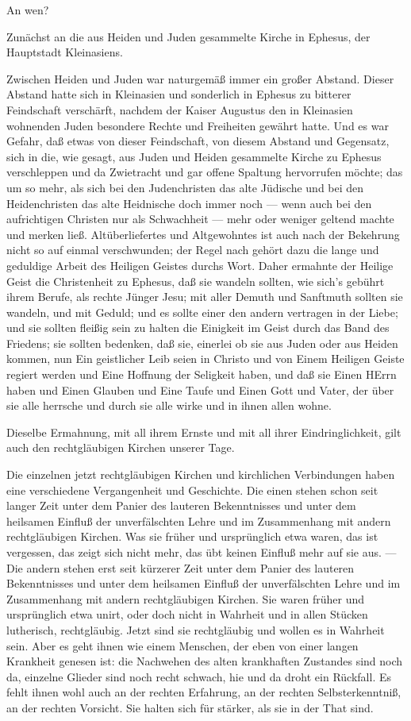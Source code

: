An wen?

Zunächst an die aus Heiden und Juden gesammelte Kirche in Ephesus, der Hauptstadt Kleinasiens.

Zwischen Heiden und Juden war naturgemäß immer ein großer Abstand. Dieser Abstand hatte sich in Kleinasien und sonderlich in Ephesus zu bitterer Feindschaft verschärft, nachdem der Kaiser Augustus den in Kleinasien wohnenden Juden besondere Rechte und Freiheiten gewährt hatte. Und es war Gefahr, daß etwas von dieser Feindschaft, von diesem Abstand und Gegensatz, sich in die, wie gesagt, aus Juden und Heiden gesammelte Kirche zu Ephesus verschleppen und da Zwietracht und gar offene Spaltung hervorrufen möchte; das um so mehr, als sich bei den Judenchristen das alte Jüdische und bei den Heidenchristen das alte Heidnische doch immer noch — wenn auch bei den aufrichtigen Christen nur als Schwachheit — mehr oder weniger geltend machte und merken ließ. Altüberliefertes und Altgewohntes ist auch nach der Bekehrung nicht so auf einmal verschwunden; der Regel nach gehört dazu die lange und geduldige Arbeit des Heiligen Geistes durchs Wort. Daher ermahnte der Heilige Geist die Christenheit zu Ephesus, daß sie wandeln sollten, wie sich’s gebührt ihrem Berufe, als rechte Jünger Jesu; mit aller Demuth und Sanftmuth sollten sie wandeln, und mit Geduld; und es sollte einer den andern vertragen in der Liebe; und sie sollten fleißig sein zu halten die Einigkeit im Geist durch das Band des Friedens; sie sollten bedenken, daß sie, einerlei ob sie aus Juden oder aus Heiden kommen, nun Ein geistlicher Leib seien in Christo und von Einem Heiligen Geiste regiert werden und Eine Hoffnung der Seligkeit haben, und daß sie Einen HErrn haben und Einen Glauben und Eine Taufe und Einen Gott und Vater, der über sie alle herrsche und durch sie alle wirke und in ihnen allen wohne.

Dieselbe Ermahnung, mit all ihrem Ernste und mit all ihrer Eindringlichkeit, gilt auch den rechtgläubigen Kirchen unserer Tage.

Die einzelnen jetzt rechtgläubigen Kirchen und kirchlichen Verbindungen haben eine verschiedene Vergangenheit und Geschichte. Die einen stehen schon seit langer Zeit unter dem Panier des lauteren Bekenntnisses und unter dem heilsamen Einfluß der unverfälschten Lehre und im Zusammenhang mit andern rechtgläubigen Kirchen. Was sie früher und ursprünglich etwa waren, das ist vergessen, das zeigt sich nicht mehr, das übt keinen Einfluß mehr auf sie aus. — Die andern stehen erst seit kürzerer Zeit unter dem Panier des lauteren Bekenntnisses und unter dem heilsamen Einfluß der unverfälschten Lehre und im Zusammenhang mit andern rechtgläubigen Kirchen. Sie waren früher und ursprünglich etwa unirt, oder doch nicht in Wahrheit und in allen Stücken lutherisch, rechtgläubig. Jetzt sind sie rechtgläubig und wollen es in Wahrheit sein. Aber es geht ihnen wie einem Menschen, der eben von einer langen Krankheit genesen ist: die Nachwehen des alten krankhaften Zustandes sind noch da, einzelne Glieder sind noch recht schwach, hie und da droht ein Rückfall. Es fehlt ihnen wohl auch an der rechten Erfahrung, an der rechten Selbsterkenntniß, an der rechten Vorsicht. Sie halten sich für stärker, als sie in der That sind.

